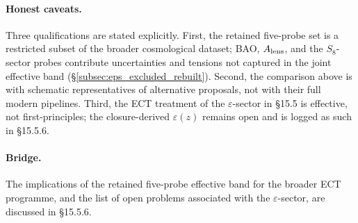 \paragraph{Honest caveats.}
Three qualifications are stated explicitly. First, the retained
five-probe set is a restricted subset of the broader cosmological
dataset; BAO, $A_{\rm lens}$, and the $S_8$-sector probes contribute
uncertainties and tensions not captured in the joint effective band
(\S\ref{subsec:eps_excluded_rebuilt}). Second, the comparison above is
with schematic representatives of alternative proposals, not with
their full modern pipelines. Third, the ECT treatment of the
$\varepsilon$-sector in \S15.5 is effective, not first-principles;
the closure-derived $\varepsilon(z)$ remains open and is logged as
such in \S15.5.6.

\paragraph{Bridge.}
The implications of the retained five-probe effective band for the
broader ECT programme, and the list of open problems associated with
the $\varepsilon$-sector, are discussed in \S15.5.6.

